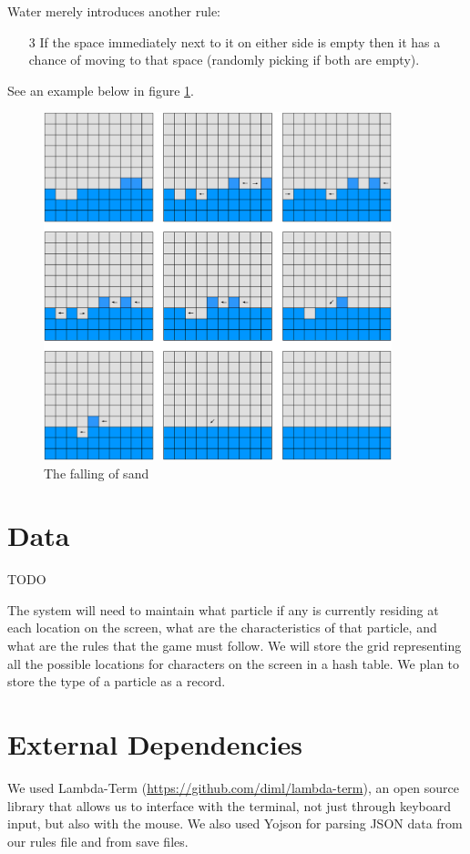 Water merely introduces another rule:
\begin{enumerate}
  \item[3] If the space immediately next to it on either side is empty then it has a chance
    of moving to that space (randomly picking if both are empty).
\end{enumerate}
See an example below in figure \ref{fig:water}.

\begin{figure}[H]
  \caption{The falling of sand}
  \label{fig:water}
  \vspace{3em}
  \center\includegraphics[width=0.9\textwidth]{images/grid_water}
\end{figure}

\section{Data}
TODO

The system will need to maintain what particle if any is currently residing at each location on the screen, what are the characteristics of that particle, and what are the rules that the game must follow. We will store the grid representing all the possible locations for characters on the screen in a hash table. We plan to store the type of a particle as a record. 

\section{External Dependencies}
We used Lambda-Term (\url{https://github.com/diml/lambda-term}), an open source library that allows us to interface with the terminal, not just through keyboard input, but also with the mouse. We also used Yojson for parsing JSON data from our rules file and from save files.

